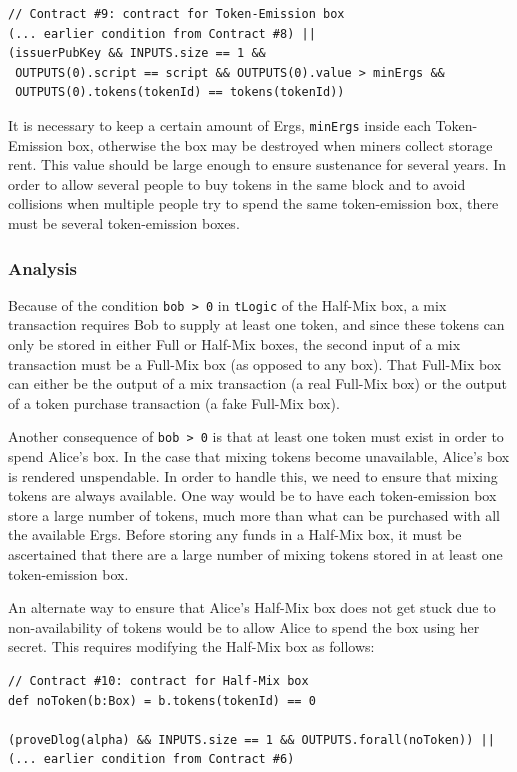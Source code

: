 \documentclass[runningheads]{llncs}
\begin{document}
{\small
\begin{Verbatim}[frame=single]
// Contract #9: contract for Token-Emission box
(... earlier condition from Contract #8) || 
(issuerPubKey && INPUTS.size == 1 && 
 OUTPUTS(0).script == script && OUTPUTS(0).value > minErgs &&
 OUTPUTS(0).tokens(tokenId) == tokens(tokenId))
\end{Verbatim}
}
It is necessary to keep a certain amount of Ergs, \texttt{minErgs} inside each Token-Emission box, otherwise the box may be destroyed when miners collect storage rent. This value should be large enough to ensure sustenance for several years. 
In order to allow several people to buy tokens in the same block and to avoid collisions when multiple people try to spend the same token-emission box, there must be several token-emission boxes. 

\subsubsection{Analysis}

Because of the condition \texttt{bob > 0} in \texttt{tLogic} of the Half-Mix box, a mix transaction requires Bob to supply at least one token, and since these tokens can only be stored in either Full or Half-Mix boxes, the second input of a mix transaction must be a Full-Mix box (as opposed to any box).
That Full-Mix box can either be the output of a mix transaction (a real Full-Mix box) or the output of a token purchase transaction (a fake Full-Mix box).

Another consequence of \texttt{bob > 0} is that at least one token must exist in order to spend Alice's box. In the case that mixing tokens become unavailable, Alice's box is rendered unspendable. In order to handle this, we need to ensure that mixing tokens are always available. One way would be to have each token-emission box store a large number of tokens, much more than what can be purchased with all the available Ergs. Before storing any funds in a Half-Mix box, it must be ascertained that there are a large number of mixing tokens stored in at least one token-emission box. 

An alternate way to ensure that Alice's Half-Mix box does not get stuck due to non-availability of tokens would be to allow Alice to spend the box using her secret. This requires modifying the Half-Mix box as follows:

{\small
\begin{Verbatim}[frame=single]
// Contract #10: contract for Half-Mix box
def noToken(b:Box) = b.tokens(tokenId) == 0

(proveDlog(alpha) && INPUTS.size == 1 && OUTPUTS.forall(noToken)) || 
(... earlier condition from Contract #6)
\end{Verbatim}
}
\end{document}
